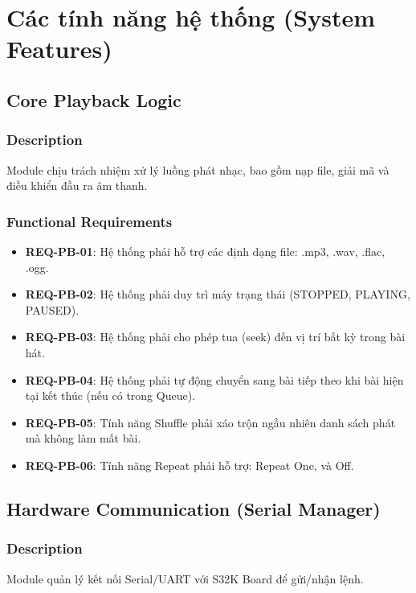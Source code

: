 \documentclass{article}
\begin{document}
\newpage
\section{Các tính năng hệ thống (System Features)}

\subsection{Core Playback Logic}
\subsubsection{Description}
Module chịu trách nhiệm xử lý luồng phát nhạc, bao gồm nạp file, giải mã và điều khiển đầu ra âm thanh.

\subsubsection{Functional Requirements}
\begin{itemize}
    \item \textbf{REQ-PB-01}: Hệ thống phải hỗ trợ các định dạng file: .mp3, .wav, .flac, .ogg.
    \item \textbf{REQ-PB-02}: Hệ thống phải duy trì máy trạng thái (STOPPED, PLAYING, PAUSED).
    \item \textbf{REQ-PB-03}: Hệ thống phải cho phép tua (seek) đến vị trí bất kỳ trong bài hát.
    \item \textbf{REQ-PB-04}: Hệ thống phải tự động chuyển sang bài tiếp theo khi bài hiện tại kết thúc (nếu có trong Queue).
    \item \textbf{REQ-PB-05}: Tính năng Shuffle phải xáo trộn ngẫu nhiên danh sách phát mà không làm mất bài.
    \item \textbf{REQ-PB-06}: Tính năng Repeat phải hỗ trợ: Repeat One, và Off.
\end{itemize}

\subsection{Hardware Communication (Serial Manager)}
\subsubsection{Description}
Module quản lý kết nối Serial/UART với S32K Board để gửi/nhận lệnh.
\end{document}
